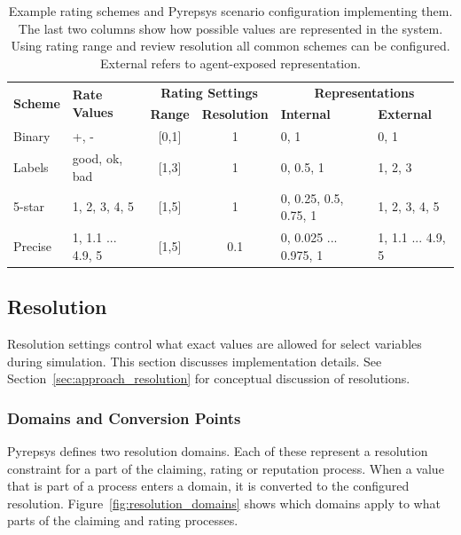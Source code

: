 \documentclass[%
    ]{\PathToTumTemplate/thesis/tum_thesis}
\begin{document}
\begin{table}[tbp]
\centering
\begin{tabular}{@{}llccll@{}}
\toprule
\multirow{2}{*}[-0.2em]{\textbf{Scheme}} & \multirow{2}{*}[-0.2em]{\textbf{Rate Values}} & \multicolumn{2}{c}{\textbf{Rating Settings}} & \multicolumn{2}{c}{\textbf{Representations}} \\ \cmidrule(lr){3-4} \cmidrule(lr){5-6} 
                        &                                  & \textbf{Range}    & \textbf{Resolution} & \textbf{Internal}    & \textbf{External}   \\ \midrule
Binary          & +, -                     & {[}0,1{]}                & 1               & 0, 1 & 0, 1           \\
Labels & good, ok, bad       & {[}1,3{]}                & 1               & 0, 0.5, 1 & 1, 2, 3          \\
5-star          & 1, 2, 3, 4, 5            & {[}1,5{]}                & 1               & 0, 0.25, 0.5, 0.75, 1 & 1, 2, 3, 4, 5            \\ 
Precise & 1, 1.1 ... 4.9, 5 & {[}1,5{]}                & 0.1         & 0, 0.025 ... 0.975, 1 & 1, 1.1 ... 4.9, 5         \\
\bottomrule
\end{tabular}
\caption{
	Example rating schemes and Pyrepsys scenario configuration implementing them.
	The last two columns show how possible values are represented in the system.
	Using rating range and review resolution all common schemes can be configured.
	External refers to agent-exposed representation.
}
\label{tab:rating_scheme_examples_pyrepsys_config}
\end{table}


\subsection{Resolution}\label{sec:impl_resolution}

Resolution settings control what exact values are allowed for select variables during simulation.
This section discusses implementation details.
See Section~\ref{sec:approach_resolution} for conceptual discussion of resolutions.

\subsubsection{Domains and Conversion Points}
Pyrepsys defines two resolution domains.
Each of these represent a resolution constraint for a part of the claiming, rating or reputation process.
When a value that is part of a process enters a domain, it is converted to the configured resolution.
Figure~\ref{fig:resolution_domains} shows which domains apply to what parts of the claiming and rating processes.
\end{document}
